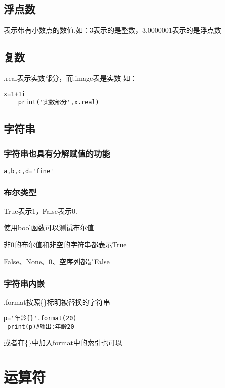 \documentclass{article}
\begin{document}
\subsection{浮点数}
表示带有小数点的数值,如：3表示的是整数，3.0000001表示的是浮点数
\subsection{复数}
.real表示实数部分，而.image表是实数
如：

\begin{lstlisting}[caption={示例Python代码}]
    x=1+1i
    print('实数部分',x.real)
\end{lstlisting}


\subsection{字符串}
\subsubsection{字符串也具有分解赋值的功能}
\begin{lstlisting}[caption={示例Python代码}]
a,b,c,d='fine'
\end{lstlisting}
\subsubsection{布尔类型}
True表示1，False表示0.
\par 使用bool函数可以测试布尔值
\par 非0的布尔值和非空的字符串都表示True
\par False、None、0、空序列都是False

\subsubsection{字符串内嵌}
.format按照\{\}标明被替换的字符串
\begin{lstlisting}[caption={示例Python代码}]
 p='年龄{}'.format(20)
 print(p)#输出:年龄20

\end{lstlisting}
\par 或者在\{\}中加入format中的索引也可以

\section{运算符}
\end{document}
